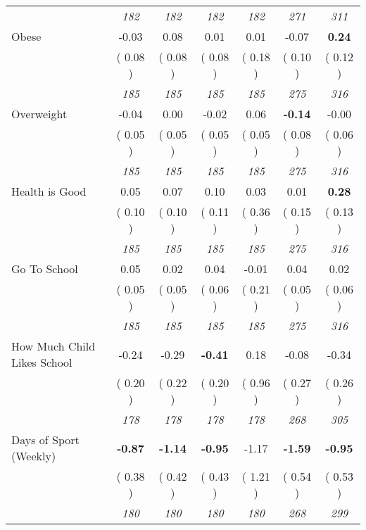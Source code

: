\begin{tabular}{l c c c c c c}
& \textit{ 182 } & \textit{ 182 } & \textit{ 182 } & \textit{ 182 } & \textit{ 271 } & \textit{ 311 } \\
Obese &     -0.03 &      0.08 &      0.01 &      0.01 &     -0.07 & \textbf{      0.24 } \\
& (     0.08 ) & (     0.08 ) & (     0.08 ) & (     0.18 ) & (     0.10 ) & (     0.12 ) \\
& \textit{ 185 } & \textit{ 185 } & \textit{ 185 } & \textit{ 185 } & \textit{ 275 } & \textit{ 316 } \\
Overweight &     -0.04 &      0.00 &     -0.02 &      0.06 & \textbf{     -0.14 } &     -0.00 \\
& (     0.05 ) & (     0.05 ) & (     0.05 ) & (     0.05 ) & (     0.08 ) & (     0.06 ) \\
& \textit{ 185 } & \textit{ 185 } & \textit{ 185 } & \textit{ 185 } & \textit{ 275 } & \textit{ 316 } \\
Health is Good &      0.05 &      0.07 &      0.10 &      0.03 &      0.01 & \textbf{      0.28 } \\
& (     0.10 ) & (     0.10 ) & (     0.11 ) & (     0.36 ) & (     0.15 ) & (     0.13 ) \\
& \textit{ 185 } & \textit{ 185 } & \textit{ 185 } & \textit{ 185 } & \textit{ 275 } & \textit{ 316 } \\
Go To School &      0.05 &      0.02 &      0.04 &     -0.01 &      0.04 &      0.02 \\
& (     0.05 ) & (     0.05 ) & (     0.06 ) & (     0.21 ) & (     0.05 ) & (     0.06 ) \\
& \textit{ 185 } & \textit{ 185 } & \textit{ 185 } & \textit{ 185 } & \textit{ 275 } & \textit{ 316 } \\
How Much Child Likes School &     -0.24 &     -0.29 & \textbf{     -0.41 } &      0.18 &     -0.08 &     -0.34 \\
& (     0.20 ) & (     0.22 ) & (     0.20 ) & (     0.96 ) & (     0.27 ) & (     0.26 ) \\
& \textit{ 178 } & \textit{ 178 } & \textit{ 178 } & \textit{ 178 } & \textit{ 268 } & \textit{ 305 } \\
Days of Sport (Weekly) & \textbf{     -0.87 } & \textbf{     -1.14 } & \textbf{     -0.95 } &     -1.17 & \textbf{     -1.59 } & \textbf{     -0.95 } \\
& (     0.38 ) & (     0.42 ) & (     0.43 ) & (     1.21 ) & (     0.54 ) & (     0.53 ) \\
& \textit{ 180 } & \textit{ 180 } & \textit{ 180 } & \textit{ 180 } & \textit{ 268 } & \textit{ 299 } \\
\bottomrule
\end{tabular}
